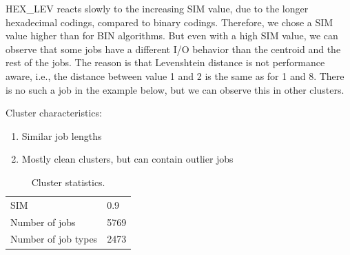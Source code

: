 \documentclass[]{llncs}
\begin{document}
HEX\_LEV reacts slowly to the increasing SIM value, due to the longer hexadecimal codings, compared to binary codings.
Therefore, we chose a SIM value higher than for BIN algorithms.
But even with a high SIM value, we can observe that some jobs have a different I/O behavior than the centroid and the rest of the jobs.
The reason is that Levenshtein distance is not performance aware, i.e., the distance between value 1 and 2 is the same as for 1 and 8.
There is no such a job in the example below, but we can observe this in other clusters.

Cluster characteristics:

\begin{enumerate}
 \item Similar job lengths
 \item Mostly clean clusters, but can contain outlier jobs
\end{enumerate}


\begin{table}
  \centering
  \begin{tabular}{ll}
    SIM & 0.9 \\
    Number of jobs & 5769 \\
    Number of job types & 2473 \\
  \end{tabular}
  \caption{Cluster statistics.}
  \label{tab:hex_lev:stats}
\end{table}
\end{document}
